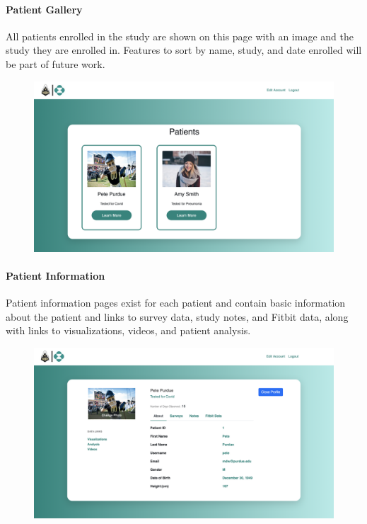 \documentclass[]{book}
\let\oldparagraph\paragraph
\renewcommand{\paragraph}[1]{\oldparagraph{#1}\mbox{}}
\begin{document}
\paragraph{Patient Gallery}\label{patient-gallery}

All patients enrolled in the study are shown on this page with an image
and the study they are enrolled in. Features to sort by name, study, and
date enrolled will be part of future work.

\begin{figure}
\centering
\includegraphics{images/Patients_gallery_page.png}
\caption{}
\end{figure}

\paragraph{Patient Information}\label{patient-information}

Patient information pages exist for each patient and contain basic
information about the patient and links to survey data, study notes, and
Fitbit data, along with links to visualizations, videos, and patient
analysis.

\begin{figure}
\centering
\includegraphics{images/Information_page.png}
\caption{}
\end{figure}
\end{document}
